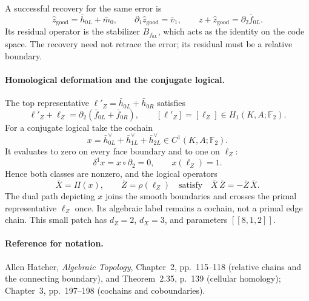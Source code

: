 A successful recovery for the same error is
\[
 \widehat z_{\mathrm{good}}=\bar h_{0L}+\bar m_0,
 \qquad \partial_1\widehat z_{\mathrm{good}}=\bar v_1,
 \qquad z+\widehat z_{\mathrm{good}}=\partial_2\bar f_{0L}.
\]
Its residual operator is the stabilizer $B_{f_{0L}}$, which acts as
the identity on the code space. The recovery need not retrace the
error; its residual must be a relative boundary.

\paragraph{Homological deformation and the conjugate logical.}
The top representative $\ell'_Z=\bar h_{0L}+\bar h_{0R}$ satisfies
\[
 \ell'_Z+\ell_Z=\partial_2(\bar f_{0L}+\bar f_{0R}),
 \qquad [\ell'_Z]=[\ell_Z]\in H_1(K,A;\mathbb F_2).
\]
For a conjugate logical take the cochain
\[
 x=\bar h_{0L}^{\vee}+\bar h_{1L}^{\vee}+\bar h_{2L}^{\vee}
 \in C^1(K,A;\mathbb F_2).
\]
It evaluates to zero on every face boundary and to one on $\ell_Z$:
\[
 \delta^1x=x\circ\partial_2=0,\qquad x(\ell_Z)=1.
\]
Hence both classes are nonzero, and the logical operators
\[
 \overline X=\Pi(x),\qquad \overline Z=\rho(\ell_Z)
 \quad\text{satisfy}\quad
 \overline X\,\overline Z=-\overline Z\,\overline X.
\]
The dual path depicting $x$ joins the smooth boundaries and crosses
the primal representative $\ell_Z$ once. Its algebraic label remains
a cochain, not a primal edge chain. This small patch has
$d_Z=2$, $d_X=3$, and parameters $[[8,1,2]]$.

\paragraph{Reference for notation.}
Allen Hatcher, \emph{Algebraic Topology}, Chapter~2, pp.~115--118
(relative chains and the connecting boundary), and Theorem~2.35,
p.~139 (cellular homology); Chapter~3, pp.~197--198 (cochains and
coboundaries).
